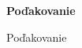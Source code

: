 \thispagestyle{empty}
\vspace*{0.75\textheight}

\noindent
\begin{flushleft}
	\textbf{
		\large
		Poďakovanie
	}
\end{flushleft}

Poďakovanie

\newpage